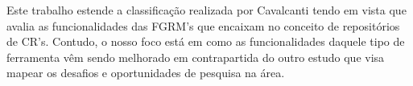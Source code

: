 Este trabalho estende a classificação realizada por Cavalcanti tendo em vista
que avalia as funcionalidades das FGRM's  que encaixam no conceito de
repositórios de CR's. Contudo, o nosso foco está em como as funcionalidades
daquele tipo de ferramenta vêm sendo melhorado em contrapartida do outro estudo
que visa mapear os desafios e oportunidades de pesquisa na área.

